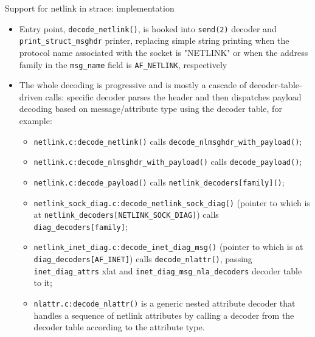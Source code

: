 \documentclass[unicode,aspectratio=169]{beamer}
\begin{document}
\begin{frame}{Support for netlink in strace: implementation}
\begin{itemize}
  \item Entry point, \texttt{decode\_netlink()}, is hooked into \texttt{send(2)}
        decoder and \texttt{print\_struct\_msghdr} printer, replacing simple
        string printing when the protocol name associated with the socket
        is "NETLINK" or when the address family in the \texttt{msg\_name}
        field is \texttt{AF\_NETLINK}, respectively
  \item The whole decoding is progressive and is mostly a cascade
        of decoder-table-driven calls: specific decoder parses the header
        and then dispatches payload decoding based on message/attribute type
        using the decoder table, for example:
  \begin{itemize}
    \item \texttt{netlink.c:decode\_netlink()} calls
          \texttt{decode\_nlmsghdr\_with\_payload()};
    \item \texttt{netlink.c:decode\_nlmsghdr\_with\_payload()} calls
          \texttt{decode\_payload()};
    \item \texttt{netlink.c:decode\_payload()} calls
          \texttt{netlink\_decoders[family]()};
    \item \texttt{netlink\_sock\_diag.c:decode\_netlink\_sock\_diag()} (pointer
          to which is at \texttt{netlink\_decoders[NETLINK\_SOCK\_DIAG]}) calls
          \texttt{diag\_decoders[family]};
    \item \texttt{netlink\_inet\_diag.c:decode\_inet\_diag\_msg()} (pointer
          to which is at \texttt{diag\_decoders[AF\_INET]}) calls
          \texttt{decode\_nlattr()}, passing \texttt{inet\_diag\_attrs} xlat
          and \texttt{inet\_diag\_msg\_nla\_decoders} decoder table to it;
    \item \texttt{nlattr.c:decode\_nlattr()} is a generic nested attribute
          decoder that handles a sequence of netlink attributes by calling
          a decoder from the decoder table according to the attribute type.
  \end{itemize}
\end{itemize}
\end{frame}
\end{document}
